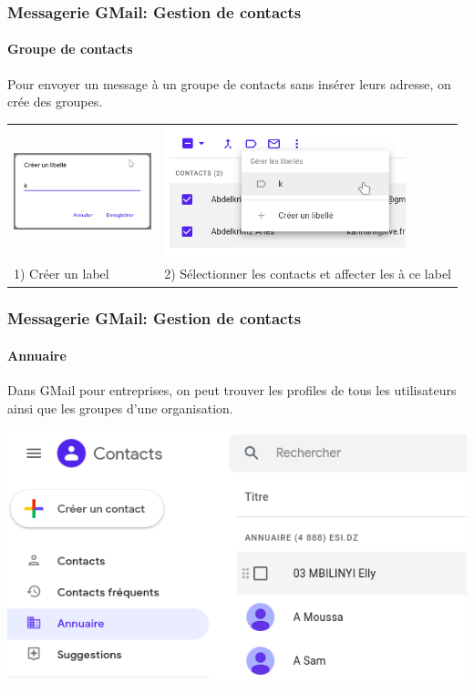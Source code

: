 \documentclass[xcolor=table]{beamer}
\begin{document}
\begin{frame}
\frametitle{Messagerie GMail: Gestion de contacts}
\framesubtitle{Groupe de contacts}

Pour envoyer un message à un groupe de contacts sans insérer leurs adresse, on crée des groupes.

\begin{tabular}{p{4.1cm}p{7.1cm}}
	\includegraphics[width=4cm]{..//img/Bweb02-ri-gmail/gmail-contacts-label1.png} & 
	\includegraphics[width=7cm]{..//img/Bweb02-ri-gmail/gmail-contacts-label2.png} \\
	
	1) Créer un label & 
	2) Sélectionner les contacts et affecter les à ce label
	
\end{tabular}

\end{frame}


\begin{frame}
\frametitle{Messagerie GMail: Gestion de contacts}
\framesubtitle{Annuaire}

Dans GMail pour entreprises, on peut trouver les profiles de tous les utilisateurs ainsi que les groupes d'une organisation. 

\begin{center}
	\includegraphics[height=.6\textheight]{..//img/Bweb02-ri-gmail/gmail-annuaire.png}
\end{center}


\end{frame}
\end{document}
